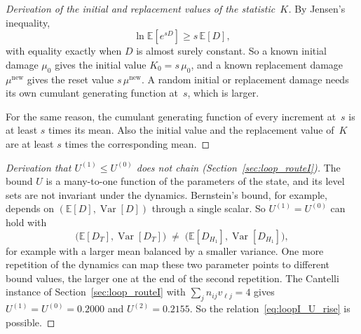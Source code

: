 \documentclass[11pt,a4paper]{article}
\theoremstyle{plain}
\theoremstyle{definition}
\theoremstyle{remark}
\begin{document}
\label{drv:chernoff_initial}
\begin{proof}[Derivation of the initial and replacement values of the statistic~$K$]
By Jensen's inequality,
\begin{equation}
  \ln\mathbb{E}[e^{sD}] \ge s\,\mathbb{E}[D],
\end{equation}
with equality exactly when $D$ is almost surely constant.
So a known initial damage $\mu_0$ gives the initial value $K_0 = s\,\mu_0$, and a known replacement damage $\mu^{\mathrm{new}}$ gives the reset value $s\,\mu^{\mathrm{new}}$.
A random initial or replacement damage needs its own cumulant generating function at~$s$, which is larger.

For the same reason, the cumulant generating function of every increment at~$s$ is at least $s$ times its mean.
Also the initial value and the replacement value of~$K$ are at least $s$ times the corresponding mean.
\end{proof}

\label{drv:loopI_no_chain}
\begin{proof}[Derivation that $U^{(1)} \le U^{(0)}$ does not chain (Section~\ref{sec:loop_routeI})]
The bound $U$ is a many-to-one function of the parameters of the state, and its level sets are not invariant under the dynamics.
Bernstein's bound, for example, depends on $(\mathbb{E}[D],\operatorname{Var}[D])$ through a single scalar.
So $U^{(1)} = U^{(0)}$ can hold with
\begin{equation}
  \big(\mathbb{E}[D_T],\operatorname{Var}[D_T]\big) \;\ne\; \big(\mathbb{E}[D_{H_1}],\operatorname{Var}[D_{H_1}]\big),
\end{equation}
for example with a larger mean balanced by a smaller variance.
One more repetition of the dynamics can map these two parameter points to different bound values, the larger one at the end of the second repetition.
The Cantelli instance of Section~\ref{sec:loop_routeI} with $\sum_j n_{ij} v_{\ell j} = 4$ gives $U^{(1)} = U^{(0)} = 0.2000$ and $U^{(2)} = 0.2155$.
So the relation~\eqref{eq:loopI_U_rise} is possible.
\end{proof}
\end{document}
